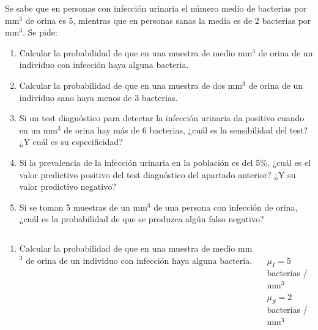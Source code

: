 \documentclass[aspectratio=149,10pt,xcolor=dvipsnames,t]{beamer}
\begin{document}
\begin{frame}[c]
\large
Se sabe que en personas con infección urinaria el número medio de bacterias por mm$^3$ de orina es 5, mientras que en personas
sanas la media es de 2 bacterias por mm$^3$.
Se pide:
\begin{enumerate}
\item Calcular la probabilidad de que en una muestra de medio mm$^3$ de orina de un individuo con infección haya alguna bacteria.
\item Calcular la probabilidad de que en una muestra de dos mm$^3$ de orina de un individuo sano haya menos de 3 bacterias. 
\item Si un test diagnóstico para detectar la infección urinaria da positivo cuando en un mm$^3$ de orina hay más de 6 bacterias,
¿cuál es la sensibilidad del test? ¿Y cuál es su especificidad?
\item Si la prevalencia de la infección urinaria en la población es del 5\%, ¿cuál es el valor predictivo positivo del test
diagnóstico del apartado anterior? ¿Y su valor predictivo negativo?
\item Si se toman 5 muestras de un mm$^3$ de una persona con infección de orina, ¿cuál es la probabilidad de que se produzca
algún falso negativo?
\end{enumerate}
\end{frame}
	
	
\begin{frame}
\begin{columns}
\begin{column}[T]{0.7\textwidth}
\begin{enumerate}
\item Calcular la probabilidad de que en una muestra de medio mm$^3$ de orina de un individuo con infección haya alguna bacteria.
\end{enumerate}
\end{column}
\begin{column}[T]{0.3\textwidth}
\\
$\mu_I = 5$ bacterias / mm$^3$\\
$\mu_S = 2$ bacterias / mm$^3$\\
\end{column}
\end{columns} 
\end{frame}
	
\end{document}
